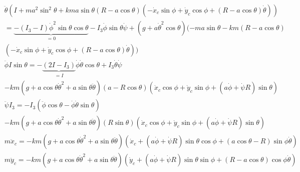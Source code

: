\documentclass[fleqn]{scrartcl}
\begin{document}
\begin{align*}
	&
	\ddot \theta (I+ma^2\sin^2\theta+kma\sin \theta(R-a\cos\theta)(-\dot x_c
	\sin\phi+\dot y_c \cos \phi+(R-a\cos\theta)\dot \theta))
	\\&
	=\underbrace{-(I_3-I)\dot \phi^2\sin\theta\cos\theta}_{=0}-I_3\dot \phi \sin \theta \dot \psi 
	+ (g+a\dot \theta^2\cos \theta)(-ma\sin\theta - km(R-a\cos \theta)
	\\&
	(-\dot x_c \sin \phi +\dot y_c \cos \phi+(R-a\cos\theta)\dot \theta))
\end{align*}
\begin{align*}
	&
	\ddot \phi I \sin\theta= -\underbrace{(2I-I_3)}_{=I}
	\dot \phi \dot \theta \cos \theta + I_3\dot \theta \dot \psi
	\\&
	-km(g+a\cos\theta\dot\theta^2+a\sin\theta\ddot\theta)
	(a-R\cos\theta)(\dot x_c\cos \phi +\dot y_c \sin\phi+
	(a\dot \phi+\dot \psi R)\sin \theta)
\end{align*}
\begin{align*}
	&\ddot \psi I_3=-I_3(\ddot \phi \cos \theta - \dot \phi \dot \theta \sin \theta)
	\\&
	-km(g+a\cos\theta\dot\theta^2+a \sin\theta\ddot \theta)(R\sin\theta)
	(\dot x_c\cos \phi +\dot y_c \sin \phi+(a\dot \phi +\dot \psi R)\sin\theta)
\end{align*}
\begin{align*}
	&m\ddot x_c=-km(g+a\cos\theta\dot \theta^2+a\sin \theta\ddot\theta)
	(\dot x_c+(a\dot \phi + \dot \psi R)\sin \theta\cos \phi+
	(a\cos \theta -R)\sin \phi \dot \theta)
\end{align*}
\begin{align*}
	&m\ddot y_c=-km(g+a\cos \theta\dot \theta^2+a \sin \theta \ddot \theta)
	(\dot y_c+(a\dot \phi + \dot \psi R)\sin \theta \sin \phi
	+(R-a\cos \theta)\cos\phi \dot \theta)
\end{align*}
\end{document}
